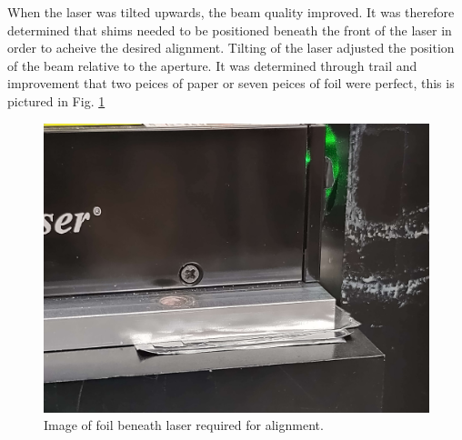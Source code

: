 When the laser was tilted upwards, the beam quality improved. It was therefore determined that shims needed to be positioned beneath the front of the laser in order to acheive the desired alignment. Tilting of the laser adjusted the position of the beam relative to the aperture. It was determined through trail and improvement that two peices of paper or seven peices of foil were perfect, this is pictured in Fig. \ref{fig:PPDFoilLaser}

\begin{figure}[H]
\begin{center}
\includegraphics[width=0.5\linewidth]{Figures/PPDFoilLaser}
\end{center}
\caption{Image of foil beneath laser required for alignment.}
\label{fig:PPDFoilLaser}
\end{figure}
